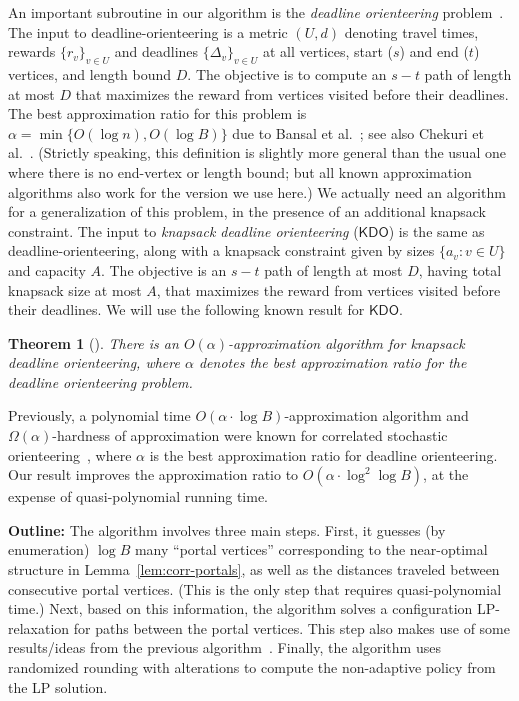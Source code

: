 \documentclass[11pt,letterpaper]{article}
\newtheorem{theorem}{Theorem}[section]
\numberwithin{algorithm}{section}
\newcommand{\kdo}{\ensuremath{\mathsf{KDO}}\xspace}
\begin{document}
An important subroutine in our algorithm is the {\em deadline orienteering} problem~\cite{BBCM04}. The input to deadline-orienteering is a metric $(U,d)$ denoting travel times, rewards $\{r_v\}_{v\in U}$ and deadlines $\{\Delta_v\}_{v\in U}$ at all vertices, start ($s$) and end ($t$) vertices, and length bound $D$. The objective is to compute an $s-t$ path of length at most $D$ that maximizes the reward from vertices visited before their deadlines. The best approximation ratio for this problem is $\alpha=\min\{O(\log n), O(\log B)\}$  due to Bansal et al.~\cite{BBCM04}; see also Chekuri et al.~\cite{CKP08}. (Strictly speaking, this definition is slightly more general than the usual one where there is no end-vertex or length bound; but all known approximation algorithms also work for the version we use here.) We actually need an algorithm for a generalization of this problem, in the presence of an additional knapsack constraint. The input to {\em knapsack deadline orienteering} (\kdo) is the same as deadline-orienteering, along with a knapsack constraint given by sizes $\{a_v:v\in U\}$ and capacity $A$. The objective is an  $s-t$ path of length at most $D$, having total knapsack size at most $A$, that maximizes the reward from vertices visited before their deadlines. We will use the following known result for \kdo.
\begin{theorem}[\cite{GKNR12}] \label{thm:kdo} There is an $O(\alpha)$-approximation algorithm for knapsack deadline orienteering, where $\alpha$ denotes the best approximation ratio for the deadline orienteering problem.
\end{theorem}



Previously, a polynomial time $O(\alpha\cdot \log B)$-approximation algorithm and $\Omega(\alpha)$-hardness of approximation were known for correlated stochastic orienteering~\cite{GKNR12}, where $\alpha$ is the best approximation ratio for deadline orienteering. Our result improves the approximation ratio to $O(\alpha\cdot \log^2\log B)$, at the expense of quasi-polynomial running time.





{\bf Outline:} The algorithm involves three main steps. First, it guesses (by enumeration) $\log B$ many ``portal vertices'' corresponding to the near-optimal structure in Lemma~\ref{lem:corr-portals}, as well as the distances traveled between consecutive portal vertices. (This is the only step that requires quasi-polynomial time.) Next, based on this information, the algorithm solves a configuration LP-relaxation for paths between the portal vertices. This step also makes use of some results/ideas from the previous algorithm~\cite{GKNR12}. Finally, the algorithm uses randomized rounding with alterations to compute the non-adaptive policy from the LP solution.
\end{document}
